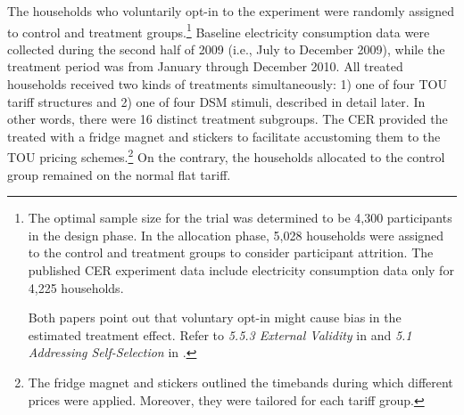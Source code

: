 The households who voluntarily opt-in to the experiment were randomly assigned to control and treatment groups.\footnote{The optimal sample size for the trial was determined to be 4,300 participants in the design phase. In the allocation phase, 5,028 households were assigned to the control and treatment groups to consider participant attrition. The published CER experiment data include electricity consumption data only for 4,225 households. \par Both papers point out that voluntary opt-in might cause bias in the estimated treatment effect. Refer to \textit{5.5.3 External Validity} in \cite{Peaking-Interest:How-Awareness-Drives-the-Effectiveness-of-Time-of-Use-Electricity-Pricing_Prest_2020} and \textit{5.1 Addressing Self-Selection} in \cite{The-Effect-of-Information-on-TOU-Electricity-Use:An-Irish-Residential-Study_Pon_2017}. } Baseline electricity consumption data were collected during the second half of 2009 (i.e., July to December 2009), while the treatment period was from January through December 2010. All treated households received two kinds of treatments simultaneously: 1) one of four TOU tariff structures and 2) one of four DSM stimuli, described in detail later. In other words, there were 16 distinct treatment subgroups. The CER provided the treated with a fridge magnet and stickers to facilitate accustoming them to the TOU pricing schemes.\footnote{The fridge magnet and stickers outlined the timebands during which different prices were applied. Moreover, they were tailored for each tariff group.} On the contrary, the households allocated to the control group remained on the normal flat tariff.

